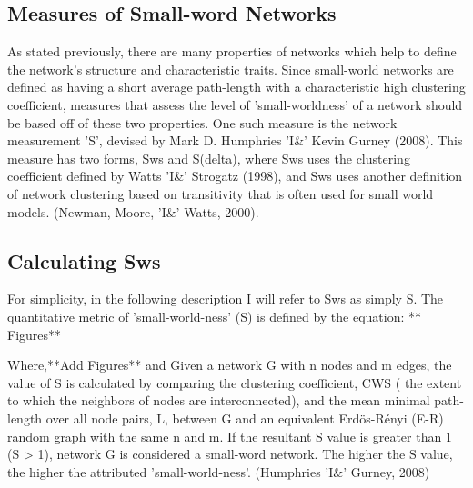 \documentclass[11pt,letterpaper,doublespacing,titlepage]{article}
\begin{document}
\subsection{Measures of Small-word Networks}
\par
As stated previously, there are many properties of networks which help to define the network's  structure and characteristic traits. Since small-world networks are defined as having a short average path-length with a characteristic high clustering coefficient, measures that assess the level of 'small-worldness' of a network should be based off of these two properties. One such measure is the network measurement 'S', devised by Mark D. Humphries 'I\&' Kevin Gurney (2008).  This measure has two forms, Sws  and S(delta), where Sws  uses the clustering coefficient defined by Watts 'I\&' Strogatz (1998), and Sws  uses another definition of network clustering based on transitivity that is often used for small world models. (Newman, Moore, 'I\&' Watts, 2000). 
\subsection{Calculating  Sws}
\par
For simplicity, in the following description I will refer to Sws  as simply S. The quantitative metric of 'small-world-ness' (S) is defined by the equation: ** Figures** 
\par
Where,**Add Figures** and Given a network G with n nodes and m edges, the value of S is calculated by comparing the clustering coefficient, CWS  ( the extent to which the neighbors of nodes are interconnected), and the mean minimal path-length over all node pairs, L, between G and an equivalent Erdös-Rényi (E-R) random graph with the same n and m. If the resultant S value is greater than 1 (S > 1), network G is considered a small-word network. The higher the S value, the higher the attributed 'small-world-ness'. (Humphries 'I\&' Gurney, 2008)
\end{document}
